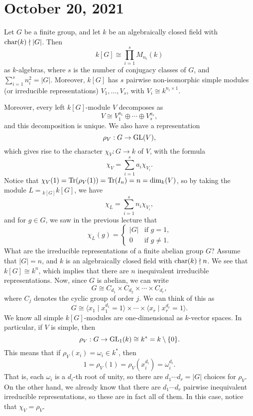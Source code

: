 \section{October 20, 2021}
Let $G$ be a finite group, and let $k$ be an algebraically closed field with 
$\operatorname{char}(k) \nmid |G|$. Then 
\[ k[G] \cong \prod_{i=1}^s M_{n_i}(k) \] 
as $k$-algebras, where $s$ is the number of conjugacy classes of $G$, and 
$\sum_{i=1}^s n_i^2 = |G|$. Moreover, $k[G]$ has $s$ pairwise non-isomorphic 
simple modules (or irreducible representations) $V_1, \dots, V_s$, with 
$V_i \cong k^{n_i\times 1}$. 

Moreover, every left $k[G]$-module $V$ decomposes as 
\[ V \cong V_1^{a_1} \oplus \cdots \oplus V_s^{a_s}, \] 
and this decomposition is unique. We also have a representation 
\[ \rho_V : G \to \operatorname{GL}(V), \] 
which gives rise to the character $\chi_V : G \to k$ of $V$, with the formula 
\[ \chi_V = \sum_{i=1}^s a_i \chi_{V_i}. \] 
Notice that $\chi_V(1) = \operatorname{Tr}(\rho_V(1)) = \operatorname{Tr}(I_n) = n = \dim_k(V)$, so 
by taking the module $L = {}_{k[G]} k[G]$, we have 
\[ \chi_L = \sum_{i=1}^s n_i \chi_{V_i}, \] 
and for $g \in G$, we saw in the previous lecture that  
\[ \chi_L(g) = \begin{cases} 
    |G| & \text{if $g = 1$,} \\ 
    0 & \text{if $g \neq 1$.}
\end{cases} \] 
What are the irreducible representations of a finite abelian group $G$? 
Assume that $|G| = n$, and $k$ is an algebraically closed field with $\operatorname{char}(k) 
\nmid n$. We see that $k[G] \cong k^n$, which implies that there are $n$ 
inequivalent irreducible representations. Now, since $G$ is abelian, we can write 
\[ G \cong C_{d_1} \times C_{d_2} \times \cdots \times C_{d_r}, \] 
where $C_j$ denotes the cyclic group of order $j$. We can think of this as 
\[ G \cong \langle x_1 \mid x_1^{d_1} = 1 \rangle \times \cdots \times 
\langle x_r \mid x_r^{d_r} = 1 \rangle. \] 
We know all simple $k[G]$-modules are one-dimensional as $k$-vector spaces. 
In particular, if $V$ is simple, then 
\[ \rho_V : G \to \operatorname{GL}_1(k) \cong k^* = k \setminus \{0\}. \] 
This means that if $\rho_V(x_i) = \omega_i \in k^*$, then 
\[ 1 = \rho_V(1) = \rho_V(x_i^{d_i}) = \omega_i^{d_i}. \] 
That is, each $\omega_i$ is a $d_i$-th root of unity, so there are 
$d_1\cdots d_r = |G|$ choices for $\rho_V$. On the other hand, we already know 
that there are $d_1 \cdots d_r$ pairwise inequivalent irreducible representations,
so these are in fact all of them. In this case, notice that $\chi_V = \rho_V$. 

